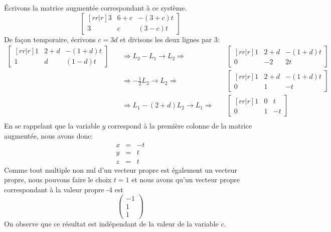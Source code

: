  Écrivons la 
matrice augmentée correspondant à ce système.
\[
\begin{bmatrix}[rr|r]
3& 6+c & -(3+c)t \\
3& c  & (3-c)t
\end{bmatrix}
\]
De façon temporaire, écrivons $c=3d$ et divisons les deux lignes par 3:
\[
\begin{matrix}
\begin{bmatrix}[rr|r]
1& 2+d & -(1+d)t \\
1& d  & (1-d)t
\end{bmatrix} & \quad \Rightarrow L_2 - L_1 \rightarrow L_2 \Rightarrow \quad&
\begin{bmatrix}[rr|r]
1& 2+d & -(1+d)t \\
0& -2  & 2t
\end{bmatrix} \\
& \quad \Rightarrow -\frac12 L_2 \rightarrow L_2 \Rightarrow \quad&
\begin{bmatrix}[rr|r]
1& 2+d & -(1+d)t \\
0& 1  & -t
\end{bmatrix} \\
& \quad \Rightarrow  L_1 - (2+d) L_2 \rightarrow L_1 \Rightarrow \quad&
\begin{bmatrix}[rr|r]
1& 0 & t \\
0& 1  & -t
\end{bmatrix} \\
\end{matrix}
\]
En se rappelant que la variable $y$ correspond à la première colonne
de la matrice augmentée, nous avons donc:
\[
\begin{matrix}
x &=& -t \\
y &=& t \\
z &=& t
\end{matrix}
\]
Comme tout multiple non nul d'un vecteur propre est également un vecteur propre, nous
pouvons faire le choix $t=1$ et nous avons qu'un vecteur propre correspondant 
à la valeur propre -4 est
\[
\begin{pmatrix}
-1 \\
1  \\
1
\end{pmatrix}
\]
On observe que ce résultat est indépendant de la valeur de la variable $c$.

